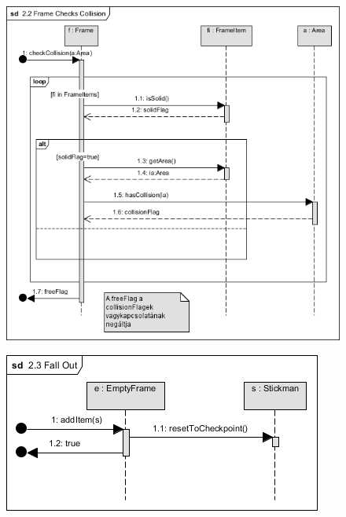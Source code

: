 		\begin{figure}[h!]
			\begin{center}
				\includegraphics[scale=0.8]{resources/seq_2-2_frameChecksCollision.png}
				\caption{}
			\end{center}
		\end{figure}
		
		\begin{figure}[h!]
			\begin{center}
				\includegraphics[scale=0.8]{resources/seq_2-3_fallOut.png}
				\caption{}
			\end{center}
		\end{figure}
		
